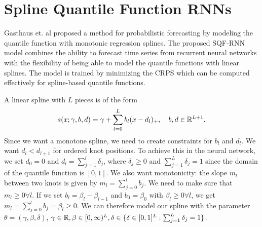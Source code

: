 \section{Spline Quantile Function RNNs}

Gasthaus et. al proposed a method for probabilistic forecasting by modeling 
the quantile function with monotonic regression splines. 
The proposed SQF-RNN model combines the ability to forecast time series 
from recurrent neural networks with the flexibility of being able to 
model the quantile functions with linear splines. 
The model is trained by minimizing the CRPS which can be computed effectively 
for spline-based quantile functions.

A linear spline with \(L\) pieces is of the form 
\[ s(x; \gamma, b, d) = \gamma + \sum_{l=0}^L b_l (x - d_l)_+, 
\quad b, d \in \mathbb{R}^{L+1}. \]
Since we want a monotone spline, we need to create constraints for \(b_l\) and \(d_l\).
We want \(d_l < d_{l+1}\) for ordered knot positions. To achieve this 
in the neural network, we set \(d_0 = 0\) and \(d_l = \sum_{j=1}^l \delta_j\), 
where \(\delta_j \geq 0\) and \(\sum_{j=1}^L \delta_j = 1\) since the domain 
of the quantile function is \([0, 1]\). 
We also want monotonicity: the slope \(m_l\) between two knots is given by 
\(m_l = \sum_{j=0}^l b_j\). We need to make sure that \(m_l \geq 0 \forall l\).
If we set \(b_l = \beta_l - \beta_{l-1}\) and \(b_0 = \beta_0\) with \(\beta_l \geq 0 \forall l\), 
we get \(m_l = \sum_{j=0}^l b_j = \beta_l \geq 0\).
We can therefore model our spline with the parameter 
\(\theta = (\gamma, \beta, \delta)\), \(\gamma \in \mathbb{R}, \beta \in [0,\infty)^{L}, 
\delta \in \{ \delta \in [0,1]^L: \sum_{j=1}^L \delta_j = 1 \}\).
